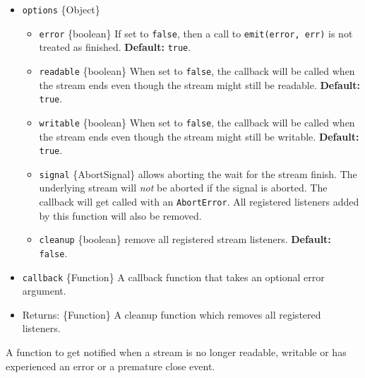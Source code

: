 \begin{itemize}
\item
  \texttt{options} \{Object\}

  \begin{itemize}
  \tightlist
  \item
    \texttt{error} \{boolean\} If set to \texttt{false}, then a call to
    \texttt{emit(\textquotesingle{}error\textquotesingle{},\ err)} is
    not treated as finished. \textbf{Default:} \texttt{true}.
  \item
    \texttt{readable} \{boolean\} When set to \texttt{false}, the
    callback will be called when the stream ends even though the stream
    might still be readable. \textbf{Default:} \texttt{true}.
  \item
    \texttt{writable} \{boolean\} When set to \texttt{false}, the
    callback will be called when the stream ends even though the stream
    might still be writable. \textbf{Default:} \texttt{true}.
  \item
    \texttt{signal} \{AbortSignal\} allows aborting the wait for the
    stream finish. The underlying stream will \emph{not} be aborted if
    the signal is aborted. The callback will get called with an
    \texttt{AbortError}. All registered listeners added by this function
    will also be removed.
  \item
    \texttt{cleanup} \{boolean\} remove all registered stream listeners.
    \textbf{Default:} \texttt{false}.
  \end{itemize}
\item
  \texttt{callback} \{Function\} A callback function that takes an
  optional error argument.
\item
  Returns: \{Function\} A cleanup function which removes all registered
  listeners.
\end{itemize}

A function to get notified when a stream is no longer readable, writable
or has experienced an error or a premature close event.

